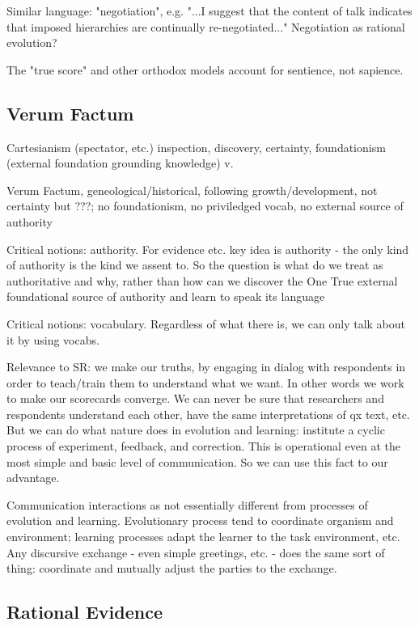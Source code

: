 \documentclass[11pt,twoside]{article}
\begin{document}
Similar language: "negotiation", e.g. "...I suggest that the content
of talk indicates that imposed hierarchies are continually
re-negotiated..."  Negotiation as rational evolution?

The "true score" and other orthodox models account for sentience, not
sapience.

\subsection{Verum Factum}

Cartesianism (spectator, etc.) inspection, discovery, certainty,
foundationism (external foundation grounding knowledge) v.

Verum Factum, geneological/historical, following growth/development,
not certainty but ???; no foundationism, no priviledged vocab, no
external source of authority

Critical notions: authority.  For evidence etc. key idea is authority - the only
kind of authority is the kind we assent to.  So the question is what
do we treat as authoritative and why, rather than how can we discover
the One True external foundational source of authority and learn to
speak its language

Critical notions: vocabulary.  Regardless of what there is, we can
only talk about it by using vocabs.

Relevance to SR: we make our truths, by engaging in dialog with
respondents in order to teach/train them to understand what we want.
In other words we work to make our scorecards converge.  We can never
be sure that researchers and respondents understand each other, have
the same interpretations of qx text, etc.  But we can do what nature
does in evolution and learning: institute a cyclic process of
experiment, feedback, and correction.  This is operational even at the
most simple and basic level of communication.  So we can use this fact
to our advantage.

Communication interactions as not essentially different from processes
of evolution and learning.  Evolutionary process tend to coordinate
organism and environment; learning processes adapt the learner to the
task environment, etc.  Any discursive exchange - even simple
greetings, etc. - does the same sort of thing: coordinate and mutually
adjust the parties to the exchange.

\subsection{Rational Evidence}
\end{document}
